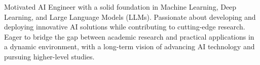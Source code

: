 

\vspace{4pt}

\begin{cvparagraph}
Motivated AI Engineer with a solid foundation in Machine Learning, Deep Learning, and Large Language Models (LLMs). Passionate about developing and deploying innovative AI solutions while contributing to cutting-edge research. Eager to bridge the gap between academic research and practical applications in a dynamic environment, with a long-term vision of advancing AI technology and pursuing higher-level studies.
\end{cvparagraph}

\vspace{4pt}
